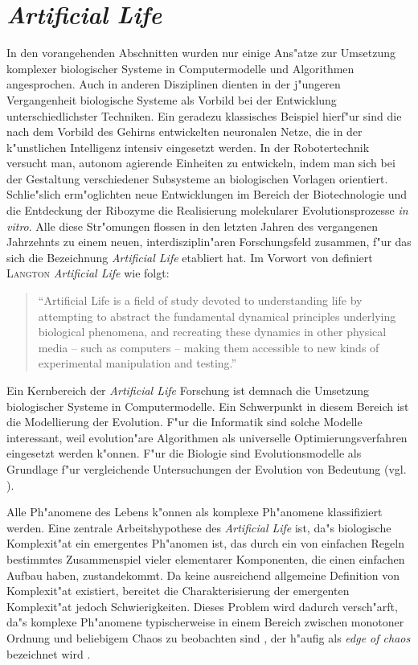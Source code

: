 \section{\textsl{Artificial Life}}

In den vorangehenden Abschnitten wurden nur einige Ans"atze zur Umsetzung komplexer biologischer Systeme in Computermodelle
und Algorithmen angesprochen. Auch in anderen Disziplinen dienten in der j"ungeren Vergangenheit biologische Systeme
als Vorbild bei der Entwicklung unterschiedlichster Techniken. Ein geradezu klassisches Beispiel hierf"ur sind die
nach dem Vorbild des Gehirns entwickelten neuronalen Netze, die in der k"unstlichen Intelligenz intensiv eingesetzt
werden. In der Robotertechnik versucht man, autonom agierende Einheiten zu entwickeln, indem man sich bei der Gestaltung
verschiedener Subsysteme an biologischen Vorlagen orientiert. Schlie"slich erm"oglichten neue Entwicklungen im Bereich
der Biotechnologie und die Entdeckung der Ribozyme die Realisierung molekularer Evolutionsprozesse \textsl{in vitro}.
Alle diese Str"omungen flossen in den letzten Jahren des vergangenen Jahrzehnts zu einem neuen, interdisziplin"aren
Forschungsfeld zusammen, f"ur das sich die Bezeichnung \textsl{Artificial Life} etabliert hat. Im Vorwort von \cite{ALifeII}
definiert \textsc{Langton} \textsl{Artificial Life} wie folgt:

\begin{quotation}
"`Artificial Life is a field of study devoted to understanding life by attempting to abstract
the fundamental dynamical principles underlying biological phenomena, and recreating these dynamics in
other physical media -- such as computers -- making them accessible to new kinds of experimental manipulation and testing."'
\end{quotation}

Ein Kernbereich der \textsl{Artificial Life} Forschung ist demnach die Umsetzung biologischer Systeme in Computermodelle.
Ein Schwerpunkt in diesem Bereich ist die Modellierung der Evolution. F"ur die Informatik sind solche Modelle interessant,
weil evolution"are Algorithmen als universelle Optimierungsverfahren eingesetzt werden k"onnen. F"ur die Biologie
sind Evolutionsmodelle als Grundlage f"ur vergleichende Untersuchungen der Evolution von Bedeutung
(vgl. \cite{Keller94,Maley94,Ray92}).

Alle Ph"anomene des Lebens k"onnen als komplexe Ph"anomene klassifiziert werden. Eine zentrale Arbeitshypothese des
\textsl{Artificial Life} ist, da"s biologische Komplexit"at ein emergentes \cite{Assad92,Baas94,Cariani92}
Ph"anomen ist, das durch ein von einfachen
Regeln bestimmtes Zusammenspiel vieler elementarer Komponenten, die einen einfachen Aufbau haben, zustandekommt.
Da keine ausreichend allgemeine Definition von Komplexit"at existiert, bereitet die Charakterisierung der emergenten
Komplexit"at jedoch Schwierigkeiten. Dieses Problem wird dadurch versch"arft, da"s komplexe Ph"anomene typischerweise
in einem Bereich zwischen monotoner Ordnung und beliebigem Chaos zu beobachten sind \cite{CampbellLNCS88},
der h"aufig als \textsl{edge of chaos}
bezeichnet wird \cite{Gutowitz95,Kauffman92,Langton92}.

